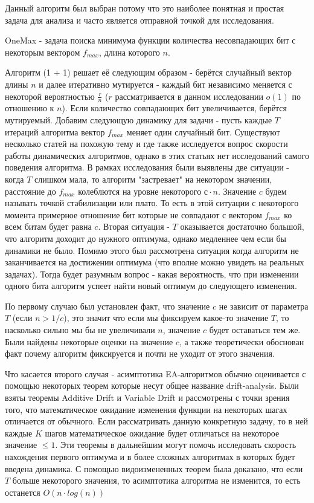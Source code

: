 \documentclass[times,specification,annotation]{itmo-student-thesis}
\begin{document}
    Данный алгоритм был выбран потому что это наиболее понятная и простая задача для анализа и часто является отправной точкой для исследования.

    OneMax - задача поиска минимума функции количества несовпадающих бит с некоторым вектором $f_{max}$, длина которого $n$.

    Алгоритм (1 + 1) решает её следующим образом - берётся случайный вектор длины $n$ и далее итеративно мутируется - каждый бит независимо меняется с некоторой вероятностью $\frac{r}{n}$ ($r$ рассматривается в данном исследовании $o(1)$ по отношению к $n$).
    Если количество совпадающих бит увеличивается, берётся мутируемый.
    Добавим следующую динамику для задачи - пусть каждые $T$ итераций алгоритма вектор $f_{max}$ меняет один случайный бит.
    Существуют несколько статей на похожую тему  \cite{dinamically_1}и\cite{dinamically_2} где также исследуется вопрос скорости работы динамических алгоритмов, однако в этих статьях нет исследований самого поведения алгоритма.
    В рамках исследования были выявлены две ситуации - когда $T$ слишком мала, то алгоритм "застревает"  на некотором значении, расстояние до $f_{max}$ колеблются на уровне некоторого $с \cdot n$.
    Значение $c$ будем называть точкой стабилизации или плато.
    То есть в этой ситуации с некоторого момента примерное отношение бит которые не совпадают с вектором $f_{max}$ ко всем битам будет равна $c$.
    Вторая ситуация - $T$ оказывается достаточно большой, что алгоритм доходит до нужного оптимума, однако медленнее чем если бы динамики не было.
    Помимо этого был рассмотрена ситуация когда алгоритм не заканчивается на достижении оптимума (что вполне можно увидеть на реальных задачах).
    Тогда будет разумным вопрос - какая вероятность, что при изменении одного бита алгоритм успеет найти новый оптимум до следующего изменения.

    По первому случаю был установлен факт, что значение $c$ не зависит от параметра $T$ (если $n > 1/c$), это значит что если мы фиксируем какое-то значение $T$, то насколько сильно мы бы не увеличивали $n$, значение $c$ будет оставаться тем же.
    Были найдены некоторые оценки на значение $c$, а также теоретически обоснован факт почему алгоритм фиксируется и почти не уходит от этого значения.

    Что касается второго случая - асимптотика EA-алгоритмов обычно оценивается с помощью некоторых теорем которые несут общее название drift-analysis.
    Были взяты теоремы Additive Drift и Variable Drift и рассмотрены с точки зрения того, что математическое ожидание изменения функции на некоторых шагах отличается от обычного.
    Если рассматривать данную конкретную задачу, то в ней каждые $K$ шагов математическое ожидание будет отличаться на некоторое значение $\leq 1$.
    Эти теоремы в дальнейшим могут помочь исследовать скорость нахождения первого оптимума и в более сложных алгоритмах в которых будет введена динамика.
    С помощью видоизмененных теорем была доказано, что если $T$ больше некоторого значения, то асимптотика алгоритма не изменится, то есть останется $O(n \cdot log(n))$
\end{document}
